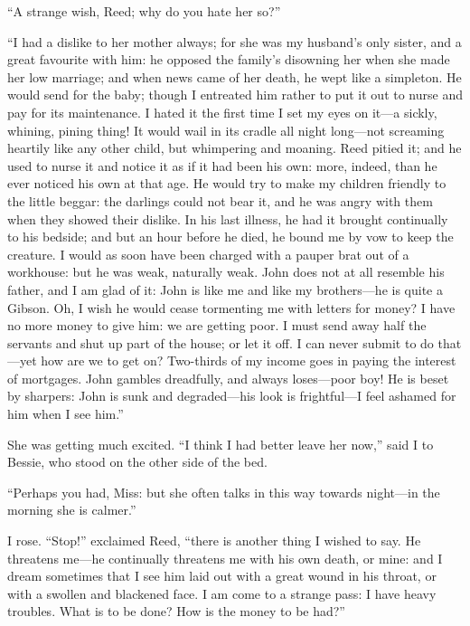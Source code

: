 \enquote{A strange wish, \Mrs{} Reed; why do you hate her so?}

\enquote{I had a dislike to her mother always; for she was my husband's
only sister, and a great favourite with him: he opposed the family's
disowning her when she made her low marriage; and when news came of her
death, he wept like a simpleton. He would send for the baby; though I
entreated him rather to put it out to nurse and pay for its
maintenance. I hated it the first time I set my eyes on it---a sickly,
whining, pining thing! It would wail in its cradle all night long---not
screaming heartily like any other child, but whimpering and moaning. 
Reed pitied it; and he used to nurse it and notice it as if it had been
his own: more, indeed, than he ever noticed his own at that age. He
would try to make my children friendly to the little beggar: the
darlings could not bear it, and he was angry with them when they showed
their dislike. In his last illness, he had it brought continually to
his bedside; and but an hour before he died, he bound me by vow to keep
the creature. I would as soon have been charged with a pauper brat out
of a workhouse: but he was weak, naturally weak. John does not at all
resemble his father, and I am glad of it: John is like me and like my
brothers---he is quite a Gibson. Oh, I wish he would cease tormenting
me with letters for money? I have no more money to give him: we are
getting poor. I must send away half the servants and shut up part of
the house; or let it off. I can never submit to do that---yet how are
we to get on? Two-thirds of my income goes in paying the interest of
mortgages. John gambles dreadfully, and always loses---poor boy! He is
beset by sharpers: John is sunk and degraded---his look is frightful---I
feel ashamed for him when I see him.}

She was getting much excited. \enquote{I think I had better leave her
now,} said I to Bessie, who stood on the other side of the bed.

\enquote{Perhaps you had, Miss: but she often talks in this way towards
night---in the morning she is calmer.}

I rose. \enquote{Stop!} exclaimed \Mrs{} Reed, \enquote{there is another
thing I wished to say. He threatens me---he continually threatens me
with his own death, or mine: and I dream sometimes that I see him laid
out with a great wound in his throat, or with a swollen and blackened
face. I am come to a strange pass: I have heavy troubles. What is to
be done? How is the money to be had?}

